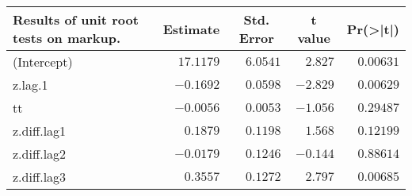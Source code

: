 \begin{table}[!tbp]
{\centering
\begin{tabular}{lrrrr}
\toprule
\multicolumn{1}{l}{Results of unit root tests on markup.}&\multicolumn{1}{c}{Estimate}&\multicolumn{1}{c}{Std. Error}&\multicolumn{1}{c}{t value}&\multicolumn{1}{c}{Pr(\textgreater |t|)}\tabularnewline
\midrule
(Intercept)&$17.1179$&$6.0541$&$ 2.827$&$0.00631$\tabularnewline
z.lag.1&$-0.1692$&$0.0598$&$-2.829$&$0.00629$\tabularnewline
tt&$-0.0056$&$0.0053$&$-1.056$&$0.29487$\tabularnewline
z.diff.lag1&$ 0.1879$&$0.1198$&$ 1.568$&$0.12199$\tabularnewline
z.diff.lag2&$-0.0179$&$0.1246$&$-0.144$&$0.88614$\tabularnewline
z.diff.lag3&$ 0.3557$&$0.1272$&$ 2.797$&$0.00685$\tabularnewline
\bottomrule
\end{tabular}}

\end{table}

